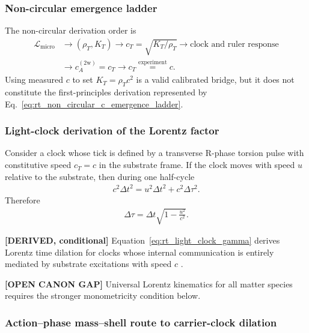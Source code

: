 \subsubsection{Non-circular emergence ladder}

The non-circular derivation order is
\begin{align}
    \mathcal L_{\mathrm{micro}}
    &\longrightarrow
    \left(\rho_T,K_T\right)
    \longrightarrow
    c_T=\sqrt{K_T/\rho_T}
    \longrightarrow
    \text{clock and ruler response}
    \nonumber\\
    &\longrightarrow
    c_A^{(2\mathrm w)}=c_T
    \longrightarrow
    c_T\stackrel{\mathrm{experiment}}{=}c .
    \label{eq:rt_non_circular_c_emergence_ladder}
\end{align}
Using measured \(c\) to set \(K_T=\rho_Tc^2\) is a valid calibrated bridge, but
it does not constitute the first-principles derivation represented by
Eq.~\eqref{eq:rt_non_circular_c_emergence_ladder}.

\subsubsection{Light-clock derivation of the Lorentz factor}

Consider a clock whose tick is defined by a transverse R-phase torsion pulse
with constitutive speed \(c_T=c\) in the substrate frame. If the clock moves with
speed \(u\) relative to the substrate, then during one half-cycle
\begin{align}
    c^2 \Delta t^2
    =
    u^2 \Delta t^2 + c^2 \Delta \tau^2 .
\end{align}
Therefore
\begin{align}
    \Delta \tau
    =
    \Delta t
    \sqrt{1-\frac{u^2}{c^2}} .
    \label{eq:rt_light_clock_gamma}
\end{align}

\textbf{[DERIVED, conditional]} Equation~\eqref{eq:rt_light_clock_gamma}
derives Lorentz time dilation for clocks whose internal communication is
entirely mediated by substrate excitations with speed \(c\) \cite{Einstein1905}.

\textbf{[OPEN CANON GAP]} Universal Lorentz kinematics for all matter species
requires the stronger monometricity condition below.

\subsubsection{Action--phase mass--shell route to carrier-clock dilation}
\label{sec:rt_action_phase_mass_shell_clock}

